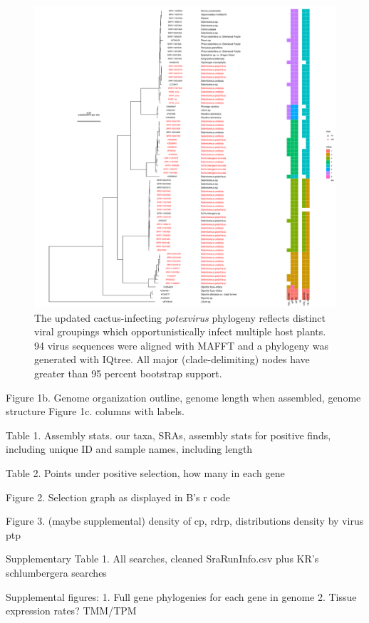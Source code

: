 \documentclass[fleqn,10pt,lineno]{wlpeerj}
\begin{document}
\begin{figure}[ht]
\centering
\includegraphics[width=1\linewidth]{figures/tree_rect_new_collapsed.pdf}
 \begin{NoHyper}
 \caption{The updated cactus-infecting \textit{potexvirus} phylogeny reflects distinct viral groupings which opportunistically infect multiple host plants. 94 virus sequences were aligned with MAFFT and a phylogeny was generated with IQtree. All major (clade-delimiting) nodes have greater than 95 percent bootstrap support.}
 \label{fig1}
 \end{NoHyper}
 \end{figure}
 
 Figure 1b. Genome organization outline, genome length when assembled, genome structure
 Figure 1c. columns with labels.

Table 1. Assembly stats. our taxa, SRAs, assembly stats for positive finds, including unique ID and sample names, including length

Table 2. Points under positive selection, how many in each gene


Figure 2. Selection graph as displayed in B's r code

Figure 3. (maybe supplemental) density of cp, rdrp, distributions density by virus ptp


Supplementary Table 1. All searches, cleaned SraRunInfo.csv plus KR's schlumbergera searches


Supplemental figures:
1. Full gene phylogenies for each gene in genome
2. Tissue expression rates? TMM/TPM



\end{document}
